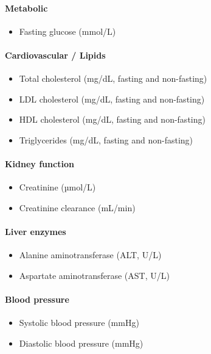 \paragraph{Metabolic}
\begin{itemize}
    \item Fasting glucose (mmol/L)
\end{itemize}

\paragraph{Cardiovascular / Lipids}
\begin{itemize}
    \item Total cholesterol (mg/dL, fasting and non-fasting)
    \item LDL cholesterol (mg/dL, fasting and non-fasting)
    \item HDL cholesterol (mg/dL, fasting and non-fasting)
    \item Triglycerides (mg/dL, fasting and non-fasting)
\end{itemize}

\paragraph{Kidney function}
\begin{itemize}
    \item Creatinine (µmol/L)
    \item Creatinine clearance (mL/min)
\end{itemize}

\paragraph{Liver enzymes}
\begin{itemize}
    \item Alanine aminotransferase (ALT, U/L)
    \item Aspartate aminotransferase (AST, U/L)
\end{itemize}

\paragraph{Blood pressure}
\begin{itemize}
    \item Systolic blood pressure (mmHg)
    \item Diastolic blood pressure (mmHg)
\end{itemize}

